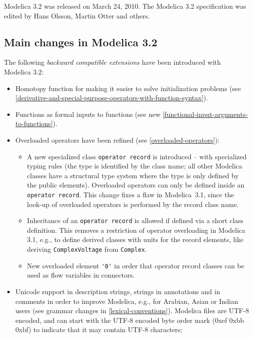 Modelica 3.2 was released on March 24, 2010. The Modelica 3.2
specification was edited by Hans Olsson, Martin Otter and others.

\subsection{Main changes in Modelica 3.2}\label{main-changes-in-modelica-3-2}

The following \emph{backward compatible extensions} have been introduced with Modelica 3.2:
\begin{itemize}
\item
  Homotopy function for making it easier to solve initialization
  problems (see \cref{derivative-and-special-purpose-operators-with-function-syntax}).
\item
  Functions as formal inputs to functions (see new \cref{functional-input-arguments-to-functions}).
\item
  Overloaded operators have been refined (see \cref{overloaded-operators}):
  \begin{itemize}
  \item
    A new specialized class \lstinline!operator record! is introduced -- with specialized typing rules (the type is identified by the class name; all other Modelica classes have a structural type
    system where the type is only defined by the public elements).  Overloaded operators can only be defined inside an \lstinline!operator record!.  This change fixes a flaw in Modelica~3.1, since
    the look-up of overloaded operators is performed by the record class name.
  \item
    Inheritance of an \lstinline!operator record! is allowed if defined via a short class definition.  This removes a restriction of operator overloading in Modelica 3.1, e.g., to define derived classes with units for the record elements, like deriving \lstinline!ComplexVoltage! from \lstinline!Complex!.
  \item
    New overloaded element \lstinline!'0'! in order that operator record classes can
    be used as flow variables in connectors.
  \end{itemize}
\item
  Unicode support in description strings, strings in annotations and in
  comments in order to improve Modelica, e.g., for Arabian, Asian or
  Indian users (see grammar changes in \cref{lexical-conventions}). Modelica files are
  UTF-8 encoded, and can start with the UTF-8 encoded byte order mark
  (0xef 0xbb 0xbf) to indicate that it may contain UTF-8 characters;

\end{itemize}
